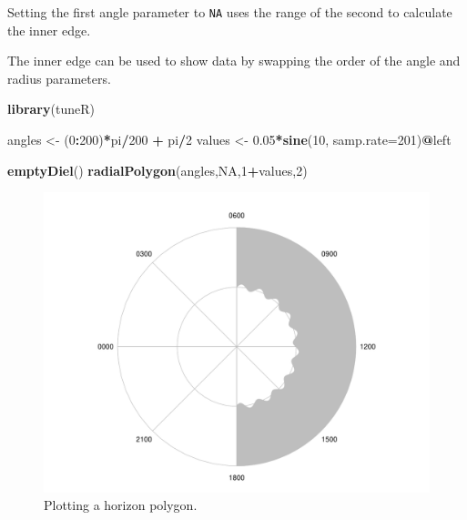 \documentclass[
]{book}
\newenvironment{Shaded}{\begin{snugshade}}{\end{snugshade}}
\newcommand{\AttributeTok}[1]{\textcolor[rgb]{0.13,0.29,0.53}{#1}}
\newcommand{\ConstantTok}[1]{\textcolor[rgb]{0.56,0.35,0.01}{#1}}
\newcommand{\DecValTok}[1]{\textcolor[rgb]{0.00,0.00,0.81}{#1}}
\newcommand{\FloatTok}[1]{\textcolor[rgb]{0.00,0.00,0.81}{#1}}
\newcommand{\FunctionTok}[1]{\textcolor[rgb]{0.13,0.29,0.53}{\textbf{#1}}}
\newcommand{\NormalTok}[1]{#1}
\newcommand{\OtherTok}[1]{\textcolor[rgb]{0.56,0.35,0.01}{#1}}
\newcommand{\SpecialCharTok}[1]{\textcolor[rgb]{0.81,0.36,0.00}{\textbf{#1}}}
\begin{document}
Setting the first angle parameter to \texttt{NA} uses the range of the second to calculate the inner edge.

The inner edge can be used to show data by swapping the order of the angle and radius parameters.

\begin{Shaded}
\begin{Highlighting}[]
\FunctionTok{library}\NormalTok{(tuneR)}

\NormalTok{angles }\OtherTok{\textless{}{-}}\NormalTok{ (}\DecValTok{0}\SpecialCharTok{:}\DecValTok{200}\NormalTok{)}\SpecialCharTok{*}\NormalTok{pi}\SpecialCharTok{/}\DecValTok{200} \SpecialCharTok{+}\NormalTok{ pi}\SpecialCharTok{/}\DecValTok{2}
\NormalTok{values }\OtherTok{\textless{}{-}} \FloatTok{0.05}\SpecialCharTok{*}\FunctionTok{sine}\NormalTok{(}\DecValTok{10}\NormalTok{, }\AttributeTok{samp.rate=}\DecValTok{201}\NormalTok{)}\SpecialCharTok{@}\NormalTok{left}

\FunctionTok{emptyDiel}\NormalTok{()}
\FunctionTok{radialPolygon}\NormalTok{(angles,}\ConstantTok{NA}\NormalTok{,}\DecValTok{1}\SpecialCharTok{+}\NormalTok{values,}\DecValTok{2}\NormalTok{)}
\end{Highlighting}
\end{Shaded}

\begin{figure}

{\centering \includegraphics[width=0.9\linewidth]{_main_files/figure-latex/radialPolygon-horizon2-1} 

}

\caption{Plotting a horizon polygon.}\label{fig:radialPolygon-horizon2}
\end{figure}
\end{document}
